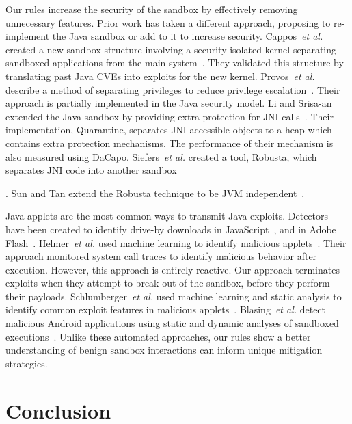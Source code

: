 \documentclass{sig-alternate-05-2015}
\begin{document}
Our rules increase the security of the sandbox
by effectively removing unnecessary features. Prior work has taken a different
approach, proposing to re-implement the Java sandbox or
add to it to increase security. Cappos~\emph{et al.} created
a new sandbox structure involving a security-isolated kernel
separating sandboxed applications from the main system~\cite{cappos_retaining_2010}.
They validated this structure by translating past Java CVEs into exploits
for the new kernel. 
Provos~\emph{et al.} describe a method of separating
privileges to reduce privilege escalation~\cite{Provos-PrivilegeEscalation}.
Their approach is partially implemented in the Java security model.
Li and Srisa-an extended the Java sandbox by providing extra protection
for JNI calls~\cite{li_quarantine:_2011}. Their implementation, Quarantine,
separates JNI accessible objects to a heap which contains extra protection
mechanisms. The performance of their mechanism is also measured using
DaCapo. Siefers~\emph{et al.} created a tool, Robusta, which separates JNI
code into another sandbox~\cite{siefers_robusta:_2010}%

. Sun and Tan extend the Robusta technique to be JVM independent~\cite{sun_jvm-portable_2012}. 

Java applets are the most common ways to transmit Java exploits. Detectors
have been created to identify drive-by downloads in JavaScript~\cite{cova_detection_2010},
and in Adobe Flash~\cite{ford_analyzing_2009}. Helmer~\emph{et al.} used
machine learning to identify malicious applets~\cite{helmer_anomalous_2001}.
Their approach monitored system call traces to identify malicious
behavior after execution. However, this approach is entirely reactive.
Our approach terminates exploits when they attempt to break out of
the sandbox, before they perform their payloads. Schlumberger~\emph{et al.}
used machine learning and static analysis to identify common 
exploit features in malicious applets~\cite{schlumberger_jarhead_2012}.
Blasing~\emph{et al.} detect malicious Android applications using static and dynamic analyses of sandboxed
executions~\cite{Blasing-AndriodSandbox}.
Unlike these automated approaches, our rules show a better understanding of
benign sandbox interactions can inform unique
mitigation strategies.

\section{Conclusion}\label{sec:Conclusion}
\end{document}
